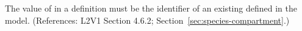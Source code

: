 The value of  in a \Species definition must be the
identifier of an existing \Compartment defined in the model.  (References:
L2V1 Section 4.6.2; Section~\ref{sec:species-compartment}.)

